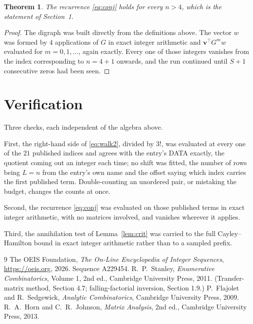 \documentclass[11pt,a4paper]{article}
\theoremstyle{plain}
\newtheorem{theorem}{Theorem}
\theoremstyle{definition}
\begin{document}
\begin{theorem}
The recurrence \eqref{eq:conj} holds for every $n>4$, which is the statement of
Section~1.
\end{theorem}

\begin{proof}
The digraph was built directly from the definitions above. The vector $w$ was formed by
$4$ applications of $G$ in exact integer arithmetic and $\mathbf{v}^{\!\top}G^{m}w$
evaluated for $m=0,1,\dots$, again exactly. Every one of those integers vanishes from the
index corresponding to $n=4+1$ onwards, and the run continued until $S+1$ consecutive
zeros had been seen.
\end{proof}

\section{Verification}

Three checks, each independent of the algebra above.

First, the right-hand side of \eqref{eq:walk2}, divided by $3!$, was evaluated at every
one of the $21$ published indices and agrees with the entry's DATA exactly, the quotient
coming out an integer each time; no shift was fitted, the number of rows being $L=n$
from the entry's own name and the offset saying which index carries the first published term.
Double-counting an unordered pair, or mistaking the budget, changes the counts at once.

Second, the recurrence \eqref{eq:conj} was evaluated on those published terms in exact
integer arithmetic, with no matrices involved, and vanishes wherever it applies.

Third, the annihilation test of Lemma~\ref{lem:crit} was carried to the full
Cayley--Hamilton bound in exact integer arithmetic rather than to a sampled prefix.

\begin{thebibliography}{9}
 The OEIS Foundation, \emph{The On-Line Encyclopedia of Integer
Sequences}, \url{https://oeis.org}, 2026. Sequence A229454.
 R.~P.~Stanley, \emph{Enumerative Combinatorics}, Volume 1, 2nd ed.,
Cambridge University Press, 2011. (Transfer-matrix method, Section 4.7; falling-factorial
inversion, Section 1.9.)
 P.~Flajolet and R.~Sedgewick, \emph{Analytic Combinatorics}, Cambridge
University Press, 2009.
 R.~A.~Horn and C.~R.~Johnson, \emph{Matrix Analysis}, 2nd ed., Cambridge
University Press, 2013.
\end{thebibliography}
\end{document}
